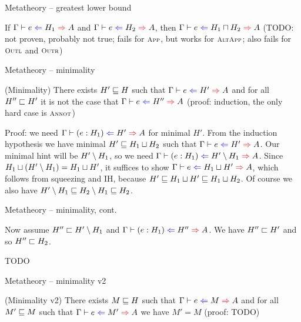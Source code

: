 \documentclass{beamer}
\begin{document}
\begin{frame}{Metatheory -- greatest lower bound}

If $\hinting{e}{H_1}{A}$ and $\hinting{e}{H_2}{A}$, then $\hinting{e}{\hintglb{H_1}{H_2}}{A}$ (TODO: not proven, probably not true; fails for $\textsc{\footnotesize{App}}$, but works for $\textsc{\footnotesize{AltApp}}$; also fails for $\textsc{\footnotesize{Outl}}$ and $\textsc{\footnotesize{Outr}}$)

\end{frame}

\begin{frame}{Metatheory -- minimality}

(Minimality) There exists $H' \sqsubseteq H$ such that $\fullhinting{\Gamma}{e}{H'}{A}$ and for all $H'' \sqsubset H'$ it is not the case that $\fullhinting{\Gamma}{e}{H''}{A}$ (proof: induction, the only hard case is $\textsc{\footnotesize{Annot}}$)

\vspace{1em}

Proof: we need $\hinting{\annot{e}{H_1}}{H'}{A}$ for minimal $H'$. From the induction hypothesis we have minimal $H' \sqsubseteq H_1 \sqcup H_2$ such that $\hinting{e}{H'}{A}$. Our minimal hint will be $H' \setminus H_1$, so we need $\hinting{\annot{e}{H_1}}{\hintdiff{H'}{H_1}}{A}$. Since $H_1 \sqcup (H' \setminus H_1) = H_1 \sqcup H'$, it suffices to show $\hinting{e}{\hintlub{H_1}{H'}}{A}$, which follows from squeezing and IH, because $H' \sqsubseteq H_1 \sqcup H' \sqsubseteq H_1 \sqcup H_2$. Of course we also have $H' \setminus H_1 \sqsubseteq H_2 \setminus H_1 \sqsubseteq H_2$.

\end{frame}

\begin{frame}{Metatheory -- minimality, cont.}

Now assume $H'' \sqsubset H' \setminus H_1$ and $\hinting{\annot{e}{H_1}}{H''}{A}$. We have $H'' \sqsubset H'$ and so $H'' \sqsubset H_2$.

\vspace{2em}

TODO

\end{frame}

\begin{frame}{Metatheory -- minimality v2}

(Minimality v2) There exists $M \sqsubseteq H$ such that $\fullhinting{\Gamma}{e}{M}{A}$ and for all $M' \sqsubseteq M$ such that $\fullhinting{\Gamma}{e}{M'}{A}$ we have $M' = M$ (proof: TODO)

\vspace{1em}

\end{frame}
\end{document}
